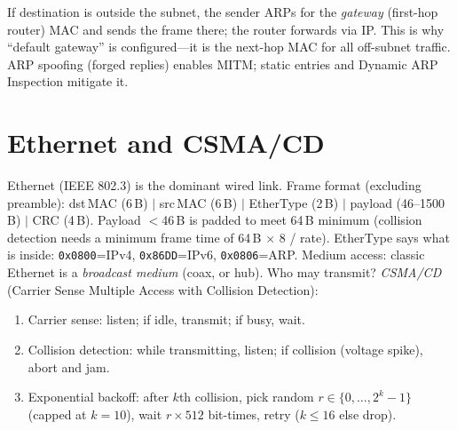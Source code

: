 If destination is outside the subnet, the sender ARPs for the \emph{gateway} (first-hop router) MAC and sends the frame there; the router forwards via IP. This is why ``default gateway'' is configured---it is the next-hop MAC for all off-subnet traffic. ARP spoofing (forged replies) enables MITM; static entries and Dynamic ARP Inspection mitigate it.
\section{Ethernet and CSMA/CD}\label{sec:ethernet}
Ethernet (IEEE 802.3) is the dominant wired link. Frame format (excluding preamble): dst\,MAC (6\,B) $\vert$ src\,MAC (6\,B) $\vert$ EtherType (2\,B) $\vert$ payload (46--1500\,B) $\vert$ CRC (4\,B). Payload $<$46\,B is padded to meet 64\,B minimum (collision detection needs a minimum frame time of 64\,B $\times$ 8 / rate). EtherType says what is inside: \texttt{0x0800}=IPv4, \texttt{0x86DD}=IPv6, \texttt{0x0806}=ARP.
Medium access: classic Ethernet is a \emph{broadcast medium} (coax, or hub). Who may transmit? \emph{CSMA/CD} (Carrier Sense Multiple Access with Collision Detection):
\begin{enumerate}[label=(\alph*), itemsep=0.3em]
    \item Carrier sense: listen; if idle, transmit; if busy, wait.
    \item Collision detection: while transmitting, listen; if collision (voltage spike), abort and jam.
    \item Exponential backoff: after $k$th collision, pick random $r\in\{0,\dots,2^{k}-1\}$ (capped at $k=10$), wait $r\times512$ bit-times, retry ($k\le16$ else drop).
\end{enumerate}
\begin{center}
\end{center}
